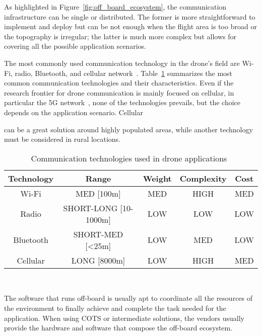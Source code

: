 As highlighted in Figure~\ref{fig:off_board_ecosystem}, the communication infrastructure can be single or distributed.
The former is more straightforward to implement and deploy but can be not enough when the flight area is too broad or the topography is irregular; 
the latter is much more complex but allows for covering all the possible application scenarios.

The most commonly used communication technology in the drone's field are Wi-Fi, radio, Bluetooth, and cellular network~\cite{pantelimon2019surveyCommunication}. 
Table~\ref{table:communication_technologies} summarizes the most common communication technologies and their characteristics.
Even if the research frontier for drone communication is mainly focused on cellular, in particular the 5G network~\cite{sharma2020communication},
none of the technologies prevails, but the choice depends on the application scenario. 
Cellular

can be a great solution around highly populated areas, while another technology must be considered in rural locations.


\begin{table}[H]
    \centering
        \begin{tabular}{|c|c|c|c|c|}
        \hline
        \rowcolor{bluepoli!40}
        \textbf{Technology} & \textbf{Range} & \textbf{Weight} & \textbf{Complexity} & \textbf{Cost} \\
        \hline \hline
        Wi-Fi & MED [100m] & MED & HIGH & MED \\
        \hline
        Radio & SHORT-LONG [10-1000m] & LOW & LOW & LOW \\
        \hline
        Bluetooth & SHORT-MED [<25m] & LOW & MED & LOW \\
        \hline
        Cellular & LONG [8000m] & LOW & HIGH & MED \\
        \hline
        \end{tabular}
        \\[10pt]
        \caption[Communication technologies]{Communication technologies used in drone applications~\cite{pantelimon2019surveyCommunication}}\label{table:communication_technologies}
    \end{table}

The software that runs off-board is usually apt to coordinate all the resources of the environment to finally achieve and 
complete the task needed for the application. When using COTS or intermediate solutions, the vendors usually provide the 
hardware and software that compose the off-board ecosystem.

